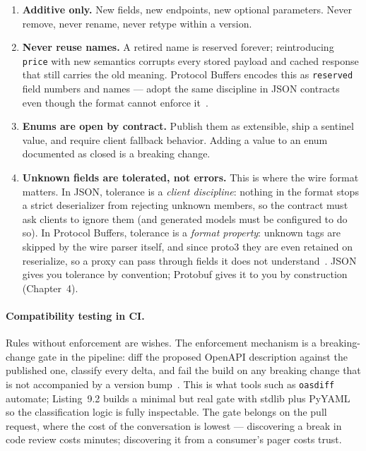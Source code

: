 \begin{enumerate}
  \item \textbf{Additive only.} New fields, new endpoints, new optional
        parameters. Never remove, never rename, never retype within a
        version.
  \item \textbf{Never reuse names.} A retired name is reserved forever;
        reintroducing \texttt{price} with new semantics corrupts every
        stored payload and cached response that still carries the old
        meaning. Protocol Buffers encodes this as \texttt{reserved} field
        numbers and names --- adopt the same discipline in JSON contracts
        even though the format cannot enforce it~\cite{protobufdocs}.
  \item \textbf{Enums are open by contract.} Publish them as extensible,
        ship a sentinel value, and require client fallback behavior. Adding
        a value to an enum documented as closed is a breaking change.
  \item \textbf{Unknown fields are tolerated, not errors.} This is where the
        wire format matters. In JSON, tolerance is a \emph{client
        discipline}: nothing in the format stops a strict deserializer from
        rejecting unknown members, so the contract must ask clients to
        ignore them (and generated models must be configured to do so). In
        Protocol Buffers, tolerance is a \emph{format property}: unknown
        tags are skipped by the wire parser itself, and since proto3 they
        are even retained on reserialize, so a proxy can pass through fields
        it does not understand~\cite{protobufdocs}. JSON gives you
        tolerance by convention; Protobuf gives it to you by construction
        (Chapter~4).
\end{enumerate}

\paragraph{Compatibility testing in CI.}
Rules without enforcement are wishes. The enforcement mechanism is a
breaking-change gate in the pipeline: diff the proposed OpenAPI description
against the published one, classify every delta, and fail the build on any
breaking change that is not accompanied by a version bump~\cite{openapi31}.
This is what tools such as \texttt{oasdiff} automate; Listing~9.2 builds a
minimal but real gate with stdlib plus PyYAML so the classification logic is
fully inspectable. The gate belongs on the pull request, where the cost of
the conversation is lowest --- discovering a break in code review costs
minutes; discovering it from a consumer's pager costs trust.

